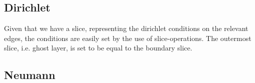     \subsection{Dirichlet}
        Given that we have a slice, representing the dirichlet conditions on the relevant
        edges, the conditions are easily set by the use of slice-operations.
        The outermost slice, i.e. ghost layer, is set to be equal to the boundary slice.

    \subsection{Neumann}
